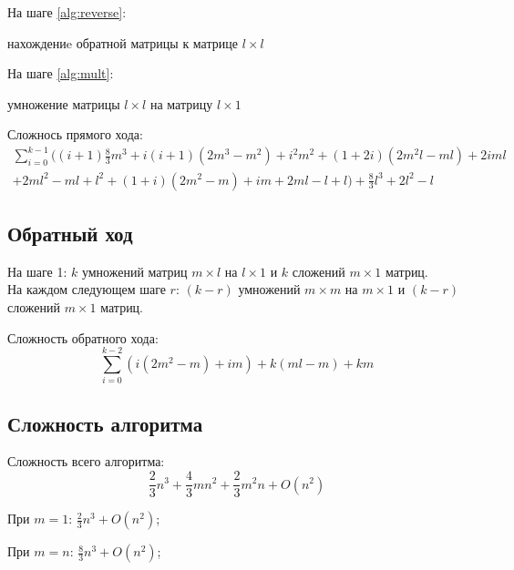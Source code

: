 \documentclass[12pt]{article}
\begin{document}
        На шаге \ref{alg:reverse}: \par
             нахождениe обратной матрицы к матрице $l \times l$
        
        На шаге \ref{alg:mult}: \par
             умножение матрицы $l \times l$ на матрицу $l \times 1$

            Сложнось прямого хода:
        \begin{multline*}
            \sum_{i=0}^{k-1} ((i + 1) \frac{8}{3}m^3 + i(i + 1) (2m^3 - m^2) + i^2m^2 + (1+2i)(2m^2l-ml) + 2iml \\ + 2ml^2 - ml + l^2 + (1 + i)(2m^2-m) + im + 2ml - l + l) + \frac{8}{3}l^3+2l^2-l
        \end{multline*}
        \subsection{Обратный ход}
        На шаге 1: $k$ умножений матриц $m \times l$ на $l \times 1$ и $k$ сложений $m \times 1$ матриц. \\
        На каждом следующем шаге $r$: $(k - r)$ умножений $m \times m$ на $m \times 1$ и $(k - r)$ сложений $m \times 1$
        матриц.

        Сложность обратного хода:
        \[ \sum^{k-2}_{i=0} (i(2m^2-m) + im) + k(ml - m) + km \]

        \subsection{Сложность алгоритма}
        Сложность всего алгоритма: 
        \[\boxed{\frac{2}{3}n^3 + \frac{4}{3}mn^2 + \frac{2}{3}m^2n + O(n^2)} \]

        При $m = 1$: $\frac{2}{3}n^3 + O(n^2)$;

        При $m = n$: $\frac{8}{3}n^3 + O(n^2)$;
\end{document}
